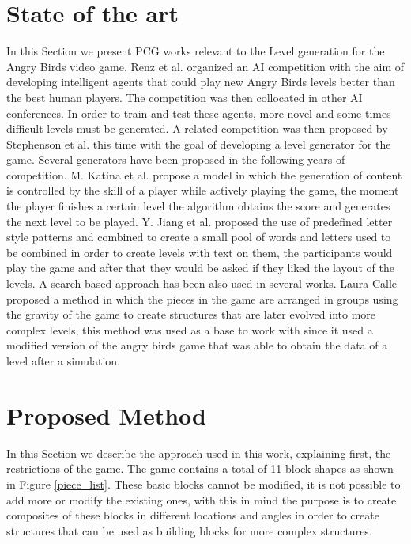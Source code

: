 \documentclass[conference]{IEEEtran}
\begin{document}
    \section{State of the art}
    \label{SoA}
    In this Section we present PCG works relevant to the Level generation for the
    Angry Birds video game. Renz et al. \cite{Renz, Renz2015TheAB} organized an AI
    competition with the aim of developing intelligent agents that could play new
    Angry Birds levels better than the best human players. The competition was then
    collocated in other AI conferences. In order to train and test these agents,
    more novel and some times difficult levels must be generated. A related
    competition was then proposed by Stephenson et al. \cite{Stephenson} this time
    with the goal of developing a level generator for the game. Several generators
    have been proposed in the following years of competition. M. Katina et al.
    \cite{Kaidan2015} propose a model in which the generation of content is
    controlled by the skill of a player while actively playing the game, the moment
    the player finishes a certain level the algorithm obtains the score and
    generates the next level to be played. Y. Jiang et al. \cite{Jiang2017} proposed
    the use of predefined letter style patterns and combined to create a small pool
    of words and letters used to be combined in order to create levels with text on
    them, the participants would play the game and after that they would be asked if
    they liked the layout of the levels. A search based approach has been also used
    in several works. Laura Calle \cite{lauracalle} proposed a method in which the 
    pieces in the game are arranged in groups using the gravity of the game to 
    create structures that are later evolved into more complex levels, this method 
    was used as a base to work with since it used a modified version of the angry 
    birds game that was able to obtain the data of a level after a simulation.
    
    \section{Proposed Method}
    
    In this Section we describe the approach used in this work, explaining first,
    the restrictions of the game.
    The game contains a total of 11 block shapes as shown in Figure \ref{piece_list}.
    These basic blocks cannot be modified, it is not possible to add more or modify the existing ones,
    with this in mind the purpose is to create composites of these blocks in
    different locations and angles in order to create structures that can be used as
    building blocks for more complex structures. 
    
\end{document}
